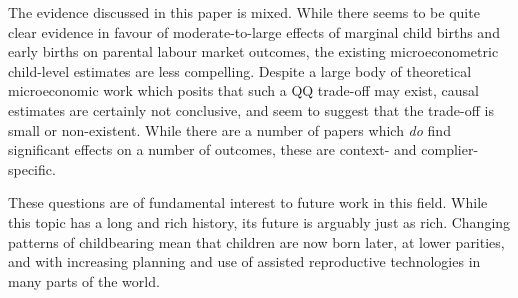 \documentclass{article}
\begin{document}
\begin{spacing}{1.4}
The evidence discussed in this paper is mixed.  While there seems to be 
quite clear evidence in favour of moderate-to-large effects of marginal child 
births and early births on parental labour market outcomes, the existing 
microeconometric child-level estimates are less compelling.  Despite a large
body of theoretical microeconomic work which posits that such a QQ trade-off 
may exist, causal estimates are certainly not conclusive, and seem to suggest 
that the trade-off is small or non-existent.  While there are a number of 
papers which \emph{do} find significant effects on a number of outcomes, these 
are context- and complier-specific.

These questions are of fundamental interest to future work in this field.
While this topic has a long and rich history, its future is arguably just as
rich.  Changing patterns of childbearing mean that children are now born
later, at lower parities, and with increasing planning and use of assisted
reproductive technologies in many parts of the world.  



\end{spacing}

\end{document}
